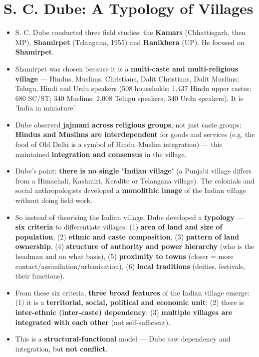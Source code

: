 \section{S. C. Dube: A Typology of Villages}

\begin{KeyConcept}
\begin{itemize}
\item S. C. Dube conducted three field studies: the \textbf{Kamars} (Chhattisgarh, then MP), \textbf{Shamirpet} (Telangana, 1955) and \textbf{Ranikhera} (UP). He focused on \textbf{Shamirpet}.
\item Shamirpet was chosen because it is a \textbf{multi-caste and multi-religious village} --- Hindus, Muslims, Christians, Dalit Christians, Dalit Muslims; Telugu, Hindi and Urdu speakers (508 households; 1,437 Hindu upper castes; 680 SC/ST; 340 Muslims; 2,008 Telugu speakers; 340 Urdu speakers). It is 'India in miniature'.
\item Dube observed \textbf{jajmani across religious groups}, not just caste groups: \textbf{Hindus and Muslims are interdependent} for goods and services (e.g. the food of Old Delhi is a symbol of Hindu--Muslim integration) --- this maintained \textbf{integration and consensus} in the village.
\end{itemize}
\end{KeyConcept}

\begin{KeyConcept}
\begin{itemize}
\item Dube's point: \textbf{there is no single 'Indian village'} (a Punjabi village differs from a Himachali, Kashmiri, Keralite or Telangana village). The colonials and social anthropologists developed a \textbf{monolithic image} of the Indian village without doing field work.
\item So instead of theorising the Indian village, Dube developed a \textbf{typology} --- \textbf{six criteria} to differentiate villages: (1) \textbf{area of land and size of population}, (2) \textbf{ethnic and caste composition}, (3) \textbf{pattern of land ownership}, (4) \textbf{structure of authority and power hierarchy} (who is the headman and on what basis), (5) \textbf{proximity to towns} (closer = more contact/assimilation/urbanisation), (6) \textbf{local traditions} (deities, festivals, their functions).
\end{itemize}
\end{KeyConcept}

\begin{KeyConcept}
\begin{itemize}
\item From these six criteria, \textbf{three broad features} of the Indian village emerge: (1) it is a \textbf{territorial, social, political and economic unit}; (2) there is \textbf{inter-ethnic (inter-caste) dependency}; (3) \textbf{multiple villages are integrated with each other} (not self-sufficient).
\item This is a \textbf{structural-functional} model --- Dube saw dependency and integration, but \textbf{not conflict}.
\end{itemize}
\end{KeyConcept}


